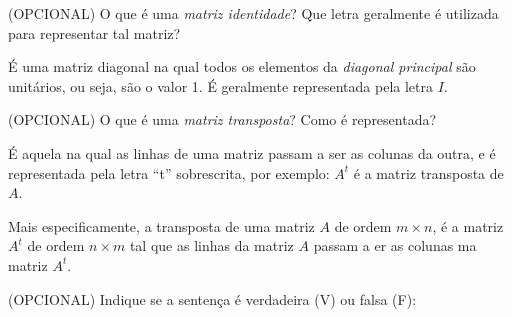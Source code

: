 \documentclass[pdftex, brazil, 12pt, oneside, addpoints]{exam}
\newcommand{\vf}[1][{}]{%
  \fillin[#1][0.25in]%
}
\begin{document}
\begin{questions}
\question
(OPCIONAL) O que é uma \emph{matriz identidade}? Que letra geralmente é utilizada para representar
tal matriz?
\begin{solution}
  É uma matriz diagonal na qual todos os elementos da \emph{diagonal principal}
  são unitários, ou seja, são o valor 1. É geralmente representada pela letra $I$.
\end{solution}

\question
(OPCIONAL) O que é uma \emph{matriz transposta}? Como é representada?
\begin{solution}
  É aquela na qual as linhas de uma matriz passam a ser as colunas da outra, e é
  representada pela letra ``t'' sobrescrita, por exemplo: $A^t$ é a matriz
  transposta de $A$.

  Mais especificamente, a transposta de uma matriz $A$ de ordem $m \times n$, é a
  matriz $A^t$ de ordem $n \times m$ tal que as linhas da matriz $A$ passam a er
  as colunas ma matriz $A^t$.
\end{solution}

\question
(OPCIONAL) Indique se a sentença é verdadeira (V) ou falsa (F):
\end{questions}
\end{document}
